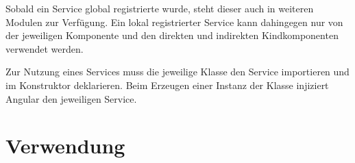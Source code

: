 Sobald ein Service global registrierte wurde, steht dieser auch in weiteren Modulen zur Verfügung. Ein lokal registrierter Service kann dahingegen nur von der jeweiligen Komponente und den direkten und indirekten Kindkomponenten verwendet werden. 

Zur Nutzung eines Services muss die jeweilige Klasse den Service importieren und im Konstruktor deklarieren. Beim Erzeugen einer Instanz der Klasse injiziert Angular den jeweiligen Service.\autocites[vgl.][92\psqq]{Steyer.2017}[vgl.][474\psqq]{Freeman.2018}


\section{Verwendung} 

